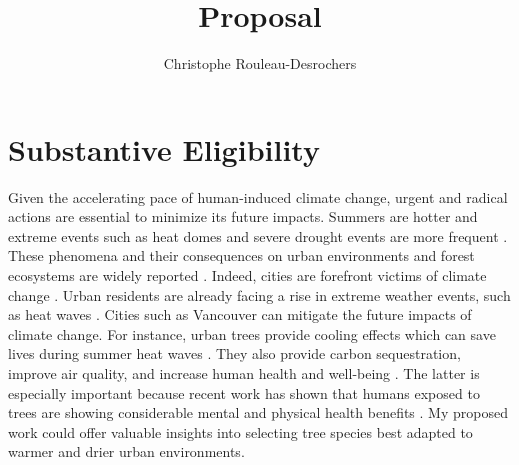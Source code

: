 \documentclass[11pt,letter]{article}
\title{Proposal}
\author{Christophe Rouleau-Desrochers}
\begin{document}

\maketitle


\section *{Substantive Eligibility} 
Given the accelerating pace of human-induced climate change, urgent and radical actions are essential to minimize its future impacts. Summers are hotter and extreme events such as heat domes and severe drought events are more frequent \cite{zhang_increased_2023}. These phenomena and their consequences on urban environments and forest ecosystems are widely reported \citep{allen_global_2010, mccarthy_climate_2010}. Indeed, cities are forefront victims of climate change \citep{das_unraveling_2024, corburn_cities_2009}. Urban residents are already facing a rise in extreme weather events, such as heat waves \citep{das_unraveling_2024}. Cities such as Vancouver can mitigate the future impacts of climate change. For instance, urban trees provide cooling effects which can save lives during summer heat waves \citep{ettinger_street_2024; zandler_cooling_2024}. They also provide carbon sequestration, improve air quality, and increase human health and well-being \citep{moreno_contribution_2024}. The latter is especially important because recent work has shown that humans exposed to trees are showing considerable mental and physical health benefits \citep{wolf_urban_2020; turnerskoff_benefits_2019}. My proposed work could offer valuable insights into selecting tree species best adapted to warmer and drier urban environments.
\end{document}
